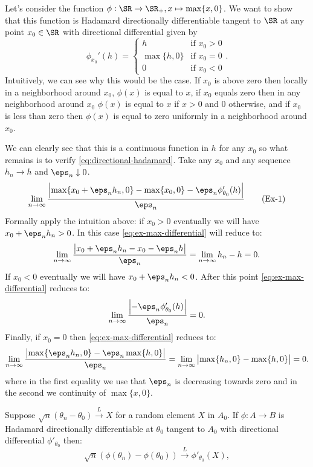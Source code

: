 \begin{example}
	\label{ex:max-directional-differential}
	Let's consider the function \(\phi:\SR\to\SR_+, x\mapsto \max\{x,0\}\). We want to show that this function is Hadamard directionally differentiable tangent to \(\SR\) at any point \(x_0\in\SR\) with directional differential given by 
	\[
		\phi_{x_0}'(h) = \begin{cases}
			h & \text{if } x_0 > 0 \\
			\max\{h,0\} &\text{if } x_0=0\\
			0 & \text{if } x_0 < 0
		\end{cases}
	.\] 
	Intuitively, we can see why this would be the case. If \(x_0\) is above zero then locally in a neighborhood around \(x_0\), \(\phi(x)\) is equal to \(x\), if \(x_0\) equals zero then in any neighborhood around \(x_0\) \(\phi(x)\) is equal to \(x\) if \(x > 0\) and \(0\) otherwise, and if \(x_0\) is less than zero then \(\phi(x)\) is equal to zero uniformly in a neighborhood around \(x_0\).

	We can clearly see that this is a continuous function in \(h\) for any \(x_0\) so what remains is to verify \cref{eq:directional-hadamard}. Take any \(x_0\) and any sequence \(h_n\to h\) and \(\eps_n\downarrow 0\).
	\begin{align}
		\label{eq:ex-max-differential}
		\lim_{n\to\infty}\frac{\left|\max\{x_0 + \eps_nh_n, 0\} - \max\{x_0,0\} - \eps_n \phi_{\theta_0}'(h)\right|}{\eps_n}\tag{Ex-1}
	\end{align}
	Formally apply the intuition above: if \(x_0 > 0\) eventually we will have \(x_0 + \eps_nh_n > 0\). In this case \eqref{eq:ex-max-differential} will reduce to:
	\[
		\lim_{n\to\infty}\frac{\left|x_0 + \eps_nh_n - x_0 - \eps_n h\right|}{\eps_n} = \lim_{n\to\infty} h_n - h = 0 
	.\]
	If \(x_0 < 0\) eventually we will have \(x_0 + \eps_nh_n <0\). After this point \eqref{eq:ex-max-differential} reduces to: 
	\[
		\lim_{n\to\infty} \frac{\left| -\eps_n \phi_{\theta_0}'(h)\right|}{\eps_n} = 0
	.\]
	Finally, if \(x_0 = 0\) then \eqref{eq:ex-max-differential} reduces to:
	\[
		\lim_{n\to\infty} \frac{\left|\max\{\eps_nh_n,0\} - \eps_n\max\{h,0\}\right|}{\eps_n} = \lim_{n\to\infty}\left|\max\{h_n,0\}-\max\{h,0\}\right| =0
	.\] 
	where in the first equality we use that \(\eps_n\) is decreasing towards zero and in the second we continuity of \(\max\{x,0\}\).
\end{example}
\begin{theorem}
	\label{thm:directional-delta-method}
	Suppose \(\sqrt{n}\left(\theta_n - \theta_0\right)\overset{L}{\to}X\) for a random element \(X\) in \(A_0\). If \(\phi:A\to B\) is Hadamard directionally differentiable at \(\theta_0\) tangent to \(A_0\) with  directional differential \(\phi'_{\theta_0}\) then:
	 \[
		 \sqrt{n}\left(\phi(\theta_n) - \phi(\theta_0)\right)\overset{L}{\to} \phi'_{\theta_0}(X)
	,\] 
\end{theorem}
